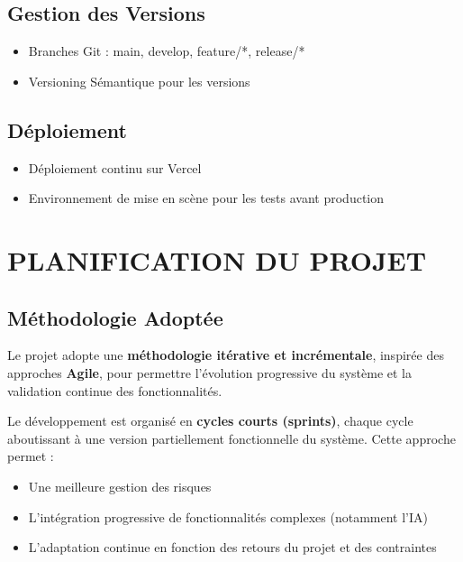 \documentclass[12pt,a4paper]{article}
\begin{document}
\subsection{Gestion des Versions}

\begin{itemize}
    \item Branches Git : main, develop, feature/*, release/*
    \item Versioning Sémantique pour les versions
\end{itemize}

\subsection{Déploiement}

\begin{itemize}
    \item Déploiement continu sur Vercel
    \item Environnement de mise en scène pour les tests avant production
\end{itemize}

\newpage

\newpage

\section{PLANIFICATION DU PROJET}

\subsection{Méthodologie Adoptée}

Le projet adopte une \textbf{méthodologie itérative et incrémentale}, inspirée des approches \textbf{Agile}, pour permettre l'évolution progressive du système et la validation continue des fonctionnalités.

Le développement est organisé en \textbf{cycles courts (sprints)}, chaque cycle aboutissant à une version partiellement fonctionnelle du système. Cette approche permet :
\begin{itemize}
    \item Une meilleure gestion des risques
    \item L'intégration progressive de fonctionnalités complexes (notamment l'IA)
    \item L'adaptation continue en fonction des retours du projet et des contraintes
\end{itemize}
\end{document}
